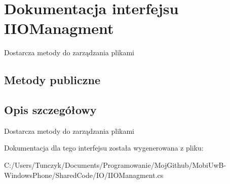 \hypertarget{a00023}{}\section{Dokumentacja interfejsu I\+I\+O\+Managment}
\label{a00023}


Dostarcza metody do zarządzania plikami  


\subsection*{Metody publiczne}


\subsection{Opis szczegółowy}
Dostarcza metody do zarządzania plikami 



Dokumentacja dla tego interfejsu została wygenerowana z pliku\+:\begin{DoxyCompactItemize}
\item 
C\+:/\+Users/\+Tunczyk/\+Documents/\+Programowanie/\+Moj\+Github/\+Mobi\+Uw\+B-\/\+Windows\+Phone/\+Shared\+Code/\+I\+O/I\+I\+O\+Managment.\+cs\end{DoxyCompactItemize}
